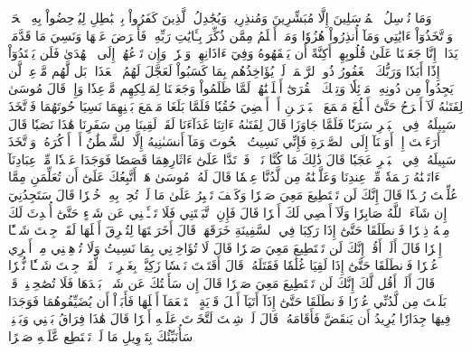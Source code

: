 وَمَا نُرۡسِلُ ٱلۡمُرۡسَلِينَ إِلَّا مُبَشِّرِينَ وَمُنذِرِينَۚ وَيُجَٰدِلُ ٱلَّذِينَ كَفَرُواْ بِٱلۡبَٰطِلِ لِيُدۡحِضُواْ بِهِ ٱلۡحَقَّۖ وَٱتَّخَذُوٓاْ ءَايَٰتِي وَمَآ أُنذِرُواْ هُزُوٗا
وَمَنۡ أَظۡلَمُ مِمَّن ذُكِّرَ بِـَٔايَٰتِ رَبِّهِۦ فَأَعۡرَضَ عَنۡهَا وَنَسِيَ مَا قَدَّمَتۡ يَدَاهُۚ إِنَّا جَعَلۡنَا عَلَىٰ قُلُوبِهِمۡ أَكِنَّةً أَن يَفۡقَهُوهُ وَفِيٓ ءَاذَانِهِمۡ وَقۡرٗاۖ وَإِن تَدۡعُهُمۡ إِلَى ٱلۡهُدَىٰ فَلَن يَهۡتَدُوٓاْ إِذًا أَبَدٗا
وَرَبُّكَ ٱلۡغَفُورُ ذُو ٱلرَّحۡمَةِۖ لَوۡ يُؤَاخِذُهُم بِمَا كَسَبُواْ لَعَجَّلَ لَهُمُ ٱلۡعَذَابَۚ بَل لَّهُم مَّوۡعِدٞ لَّن يَجِدُواْ مِن دُونِهِۦ مَوۡئِلٗا
وَتِلۡكَ ٱلۡقُرَىٰٓ أَهۡلَكۡنَٰهُمۡ لَمَّا ظَلَمُواْ وَجَعَلۡنَا لِمَهۡلِكِهِم مَّوۡعِدٗا
وَإِذۡ قَالَ مُوسَىٰ لِفَتَىٰهُ لَآ أَبۡرَحُ حَتَّىٰٓ أَبۡلُغَ مَجۡمَعَ ٱلۡبَحۡرَيۡنِ أَوۡ أَمۡضِيَ حُقُبٗا
فَلَمَّا بَلَغَا مَجۡمَعَ بَيۡنِهِمَا نَسِيَا حُوتَهُمَا فَٱتَّخَذَ سَبِيلَهُۥ فِي ٱلۡبَحۡرِ سَرَبٗا
فَلَمَّا جَاوَزَا قَالَ لِفَتَىٰهُ ءَاتِنَا غَدَآءَنَا لَقَدۡ لَقِينَا مِن سَفَرِنَا هَٰذَا نَصَبٗا
قَالَ أَرَءَيۡتَ إِذۡ أَوَيۡنَآ إِلَى ٱلصَّخۡرَةِ فَإِنِّي نَسِيتُ ٱلۡحُوتَ وَمَآ أَنسَىٰنِيهُ إِلَّا ٱلشَّيۡطَٰنُ أَنۡ أَذۡكُرَهُۥۚ وَٱتَّخَذَ سَبِيلَهُۥ فِي ٱلۡبَحۡرِ عَجَبٗا
قَالَ ذَٰلِكَ مَا كُنَّا نَبۡغِۚ فَٱرۡتَدَّا عَلَىٰٓ ءَاثَارِهِمَا قَصَصٗا
فَوَجَدَا عَبۡدٗا مِّنۡ عِبَادِنَآ ءَاتَيۡنَٰهُ رَحۡمَةٗ مِّنۡ عِندِنَا وَعَلَّمۡنَٰهُ مِن لَّدُنَّا عِلۡمٗا
قَالَ لَهُۥ مُوسَىٰ هَلۡ أَتَّبِعُكَ عَلَىٰٓ أَن تُعَلِّمَنِ مِمَّا عُلِّمۡتَ رُشۡدٗا
قَالَ إِنَّكَ لَن تَسۡتَطِيعَ مَعِيَ صَبۡرٗا
وَكَيۡفَ تَصۡبِرُ عَلَىٰ مَا لَمۡ تُحِطۡ بِهِۦ خُبۡرٗا
قَالَ سَتَجِدُنِيٓ إِن شَآءَ ٱللَّهُ صَابِرٗا وَلَآ أَعۡصِي لَكَ أَمۡرٗا
قَالَ فَإِنِ ٱتَّبَعۡتَنِي فَلَا تَسۡـَٔلۡنِي عَن شَيۡءٍ حَتَّىٰٓ أُحۡدِثَ لَكَ مِنۡهُ ذِكۡرٗا
فَٱنطَلَقَا حَتَّىٰٓ إِذَا رَكِبَا فِي ٱلسَّفِينَةِ خَرَقَهَاۖ قَالَ أَخَرَقۡتَهَا لِتُغۡرِقَ أَهۡلَهَا لَقَدۡ جِئۡتَ شَيۡـًٔا إِمۡرٗا
قَالَ أَلَمۡ أَقُلۡ إِنَّكَ لَن تَسۡتَطِيعَ مَعِيَ صَبۡرٗا
قَالَ لَا تُؤَاخِذۡنِي بِمَا نَسِيتُ وَلَا تُرۡهِقۡنِي مِنۡ أَمۡرِي عُسۡرٗا
فَٱنطَلَقَا حَتَّىٰٓ إِذَا لَقِيَا غُلَٰمٗا فَقَتَلَهُۥ قَالَ أَقَتَلۡتَ نَفۡسٗا زَكِيَّةَۢ بِغَيۡرِ نَفۡسٖ لَّقَدۡ جِئۡتَ شَيۡـٔٗا نُّكۡرٗا
۞قَالَ أَلَمۡ أَقُل لَّكَ إِنَّكَ لَن تَسۡتَطِيعَ مَعِيَ صَبۡرٗا
قَالَ إِن سَأَلۡتُكَ عَن شَيۡءِۭ بَعۡدَهَا فَلَا تُصَٰحِبۡنِيۖ قَدۡ بَلَغۡتَ مِن لَّدُنِّي عُذۡرٗا
فَٱنطَلَقَا حَتَّىٰٓ إِذَآ أَتَيَآ أَهۡلَ قَرۡيَةٍ ٱسۡتَطۡعَمَآ أَهۡلَهَا فَأَبَوۡاْ أَن يُضَيِّفُوهُمَا فَوَجَدَا فِيهَا جِدَارٗا يُرِيدُ أَن يَنقَضَّ فَأَقَامَهُۥۖ قَالَ لَوۡ شِئۡتَ لَتَّخَذۡتَ عَلَيۡهِ أَجۡرٗا
قَالَ هَٰذَا فِرَاقُ بَيۡنِي وَبَيۡنِكَۚ سَأُنَبِّئُكَ بِتَأۡوِيلِ مَا لَمۡ تَسۡتَطِع عَّلَيۡهِ صَبۡرًا
